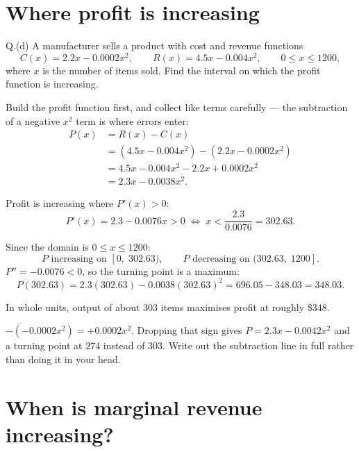 \section{Where profit is increasing}

\begin{question}{Q.(d)}
A manufacturer sells a product with cost and revenue functions
\[
C(x)=2.2x-0.0002x^{2},\qquad R(x)=4.5x-0.004x^{2},\qquad 0\le x\le 1200,
\]
where $x$ is the number of items sold. Find the interval on which the profit
function is increasing.
\end{question}

\begin{solution}
Build the profit function first, and collect like terms carefully --- the
subtraction of a negative $x^{2}$ term is where errors enter:
\[
\begin{aligned}
P(x)&=R(x)-C(x)\\
&=\left(4.5x-0.004x^{2}\right)-\left(2.2x-0.0002x^{2}\right)\\
&=4.5x-0.004x^{2}-2.2x+0.0002x^{2}\\
&=2.3x-0.0038x^{2} .
\end{aligned}
\]

Profit is increasing where $P'(x)>0$:
\[
P'(x)=2.3-0.0076x>0
\;\Longleftrightarrow\;
x<\frac{2.3}{0.0076}=302.63 .
\]

Since the domain is $0\le x\le 1200$:
\[
\text{$P$ increasing on } [0,\;302.63), \qquad
\text{$P$ decreasing on } (302.63,\;1200] .
\]
$P''=-0.0076<0$, so the turning point is a maximum:
\[
P(302.63)=2.3(302.63)-0.0038(302.63)^{2}=696.05-348.03=348.03 .
\]

\medskip
In whole units, output of about 303 items maximises profit at roughly \$348.

\end{solution}

\begin{pitfall}
$-(-0.0002x^{2})=+0.0002x^{2}$. Dropping that sign gives
$P=2.3x-0.0042x^{2}$ and a turning point at $274$ instead of $303$. Write out
the subtraction line in full rather than doing it in your head.
\end{pitfall}

\section{When is marginal revenue increasing?}

